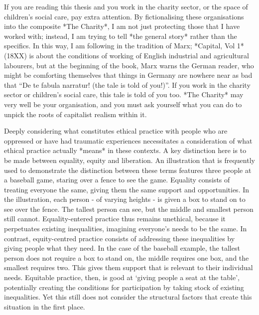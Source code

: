 If you are reading this thesis and you work in the charity sector, or the space of children’s social care, pay extra attention. By fictionalising these organisations into the composite *The Charity*, I am not just protecting those that I have worked with; instead, I am trying to tell *the general story* rather than the specifics. In this way, I am following in the tradition of Marx;  *Capital, Vol 1* (18XX) is about the conditions of working of English industrial and agricultural labourers, but at the beginning of the book, Marx warns the German reader, who might be comforting themselves that things in Germany are nowhere near as bad that “De te fabula narratur! (the tale is told of you!)”.  If you work in the charity sector or children’s social care, this tale is told of you too. *The Charity* may very well be your organisation, and you must ask yourself what you can do to unpick the roots of capitalist realism within it. 





 Deeply considering what constitutes ethical practice with people who are oppressed  or have had traumatic experiences necessitates a consideration of what ethical practice actually *means* in these contexts. A key distinction here is to be made between equality, equity and liberation. An illustration that is frequently used to demonstrate the distinction between these terms features three people at a baseball game, staring over a fence to see the game. Equality consists of treating everyone the same, giving them the same support and opportunities. In the illustration, each person - of varying heights - is given a box to stand on to see over the fence. The tallest person can see, but the middle and smallest person still cannot. Equality-entered practice thus remains unethical, because it perpetuates existing inequalities, imagining everyone’s needs to be the same. In contrast, equity-centred practice consists of addressing these inequalities by giving people what they need. In the case of the baseball example, the tallest person does not require a box to stand on, the middle requires one box, and the smallest requires two. This gives them support that is relevant to their individual needs. Equitable practice, then, is good at ‘giving people a seat at the table’, potentially creating the conditions for participation by taking stock of existing inequalities. Yet this still does not consider the structural factors that create this situation in the first place.

